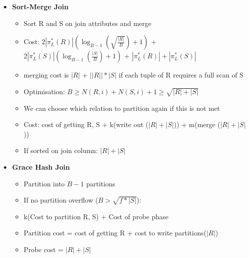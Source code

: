 \documentclass[10pt, landscape]{article}
\begin{document}
\begin{multicols}{4}
\begin{multicols}{2}
\begin{itemize}
      \item \textbf{Sort-Merge Join} \newline
      \begin{itemize}
        \item Sort R and S on join attributes and merge
        \item Cost: $2|\pi^*_L(R)|(\log_{B-1}(\sqrt{\frac{|R|}{B}})+1)$ + $2|\pi^*_L(S)|(\log_{B-1}(\frac{|S|}{B})+1)$ + $|\pi^*_L(R)|+|\pi^*_L(S)|$
        \item merging cost is $|R|$ + $||R||*|S|$ if each tuple of R requires a full scan of S
        \item Optimisation: $B \ge N(R,i) + N(S,i) + 1 \ge \sqrt{|R|+|S|}$ 
        \item We can choose which relation to partition again if this is not met
        \item Cost: cost of getting R, S + k(write out ($|R|+|S|$)) + m(merge ($|R|+|S|$))
        \item If sorted on join column: $|R|+|S|$
      \end{itemize}

      \item \textbf{Grace Hash Join} \newline
      \begin{itemize}
        \item Partition into $B-1$ partitions
        \item If no partition overflow ($B > \sqrt{f*|S|}$):
        \item k(Cost to partition R, S) + Cost of probe phase
        \item Partition cost = cost of getting R + cost to write partitions($|R|$)
        \item Probe cost = $|R| + |S|$
      \end{itemize}

    \end{itemize}
\end{multicols}



\end{multicols}
\end{document}
